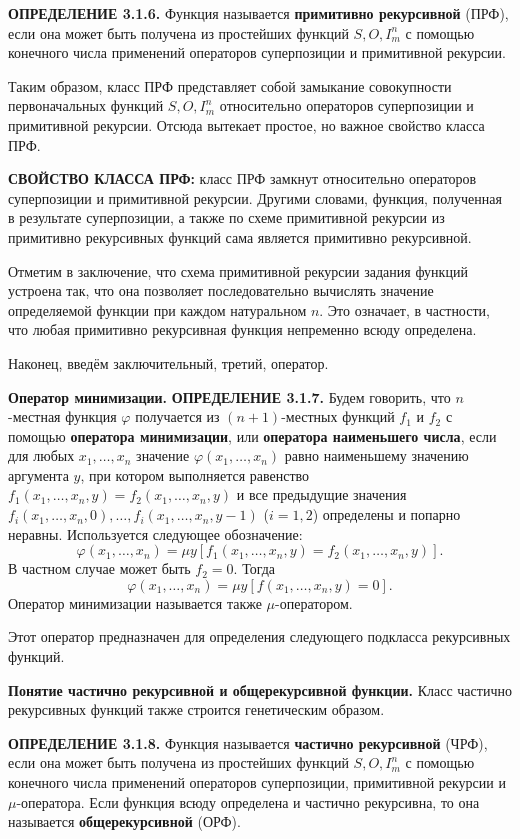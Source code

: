 \documentclass[a4paper,12pt]{article}
\begin{document}
\textbf{ОПРЕДЕЛЕНИЕ 3.1.6.} Функция называется \textbf{примитивно рекурсивной} (ПРФ), если она может быть получена из простейших функций \(S, O, I_m^n\) с помощью конечного числа применений операторов суперпозиции и примитивной рекурсии.

Таким образом, класс ПРФ представляет собой замыкание совокупности первоначальных функций \(S, O, I_m^n\) относительно операторов суперпозиции и примитивной рекурсии. Отсюда вытекает простое, но важное свойство класса ПРФ.

\textbf{СВОЙСТВО КЛАССА ПРФ:} класс ПРФ замкнут относительно операторов суперпозиции и примитивной рекурсии. Другими словами, функция, полученная в результате суперпозиции, а также по схеме примитивной рекурсии из примитивно рекурсивных функций сама является примитивно рекурсивной.

Отметим в заключение, что схема примитивной рекурсии задания функций устроена так, что она позволяет последовательно вычислять значение определяемой функции при каждом натуральном \(n\). Это означает, в частности, что любая примитивно рекурсивная функция непременно всюду определена.

Наконец, введём заключительный, третий, оператор.

\textbf{Оператор минимизации.} \textbf{ОПРЕДЕЛЕНИЕ 3.1.7.} Будем говорить, что \(n\)-местная функция \(\varphi\) получается из \((n+1)\)-местных функций \(f_1\) и \(f_2\) с помощью \textbf{оператора минимизации}, или \textbf{оператора наименьшего числа}, если для любых \(x_1, \dots, x_n\) значение \(\varphi(x_1, \dots, x_n)\) равно наименьшему значению аргумента \(y\), при котором выполняется равенство \(f_1(x_1, \dots, x_n, y) = f_2(x_1, \dots, x_n, y)\) и все предыдущие значения \(f_i(x_1, \dots, x_n, 0), \dots, f_i(x_1, \dots, x_n, y-1)\) (\(i=1,2\)) определены и попарно неравны. Используется следующее обозначение:
\[
\varphi(x_1, \dots, x_n) = \mu y [f_1(x_1, \dots, x_n, y) = f_2(x_1, \dots, x_n, y)].
\]
В частном случае может быть \(f_2 = 0\). Тогда
\[
\varphi(x_1, \dots, x_n) = \mu y [f(x_1, \dots, x_n, y) = 0].
\]
Оператор минимизации называется также \(\mu\)-оператором.

Этот оператор предназначен для определения следующего подкласса рекурсивных функций.

\textbf{Понятие частично рекурсивной и общерекурсивной функции.} Класс частично рекурсивных функций также строится генетическим образом.

\textbf{ОПРЕДЕЛЕНИЕ 3.1.8.} Функция называется \textbf{частично рекурсивной} (ЧРФ), если она может быть получена из простейших функций \(S, O, I_m^n\) с помощью конечного числа применений операторов суперпозиции, примитивной рекурсии и \(\mu\)-оператора. Если функция всюду определена и частично рекурсивна, то она называется \textbf{общерекурсивной} (ОРФ).
\end{document}
